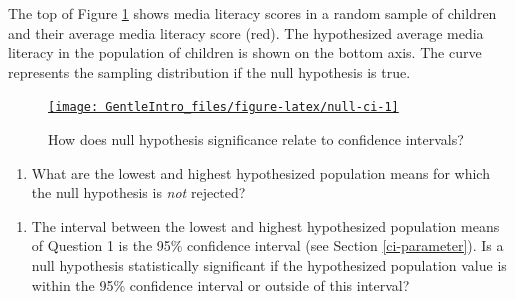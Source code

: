 \documentclass[a4paper]{book}
\newenvironment{Shaded}{\begin{snugshade}}{\end{snugshade}}
\newcommand{\KeywordTok}[1]{\textcolor[rgb]{0,0,0}{\textbf{#1}}}
\newcommand{\DecValTok}[1]{\textcolor[rgb]{0.00,0.00,0.00}{#1}}
\newcommand{\StringTok}[1]{\textcolor[rgb]{0.00,0.00,0.00}{#1}}
\newcommand{\ControlFlowTok}[1]{\textcolor[rgb]{0.00,0.00,0.00}{\textbf{#1}}}
\newcommand{\OperatorTok}[1]{\textcolor[rgb]{0.00,0.00,0.00}{\textbf{#1}}}
\newcommand{\NormalTok}[1]{#1}
\providecommand{\tightlist}{%
  \setlength{\itemsep}{0pt}\setlength{\parskip}{0pt}}
\theoremstyle{definition}
\theoremstyle{definition}
\theoremstyle{definition}
\theoremstyle{remark}
\begin{document}
The top of Figure \ref{fig:null-ci} shows media literacy scores in a
random sample of children and their average media literacy score (red).
The hypothesized average media literacy in the population of children is
shown on the bottom axis. The curve represents the sampling distribution
if the null hypothesis is true.

\begin{figure}[H]
\href{http://82.196.4.233:3838/apps/null-ci/}{\texttt{[image: GentleIntro\_files/figure-latex/null-ci-1]} }\caption{How does null hypothesis significance relate to confidence intervals?}\label{fig:null-ci}
\end{figure}

\begin{enumerate}
\def\labelenumi{\arabic{enumi}.}
\tightlist
\item
  What are the lowest and highest hypothesized population means for
  which the null hypothesis is \emph{not} rejected?
\end{enumerate}

\begin{Shaded}
\end{Shaded}

\begin{enumerate}
\def\labelenumi{\arabic{enumi}.}
\setcounter{enumi}{1}
\tightlist
\item
  The interval between the lowest and highest hypothesized population
  means of Question 1 is the 95\% confidence interval (see Section
  \ref{ci-parameter}). Is a null hypothesis statistically significant if
  the hypothesized population value is within the 95\% confidence
  interval or outside of this interval?
\end{enumerate}
\end{document}
